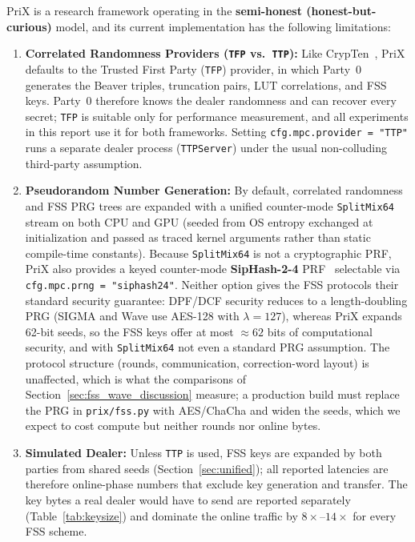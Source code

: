 \documentclass[11pt]{article}
\begin{document}
PriX is a research framework operating in the \textbf{semi-honest (honest-but-curious)} model, and its current implementation has the following limitations:
\begin{enumerate}
    \item \textbf{Correlated Randomness Providers (\texttt{TFP} vs.\ \texttt{TTP}):} Like CrypTen~\cite{knott2021crypten}, PriX defaults to the Trusted First Party (\texttt{TFP}) provider, in which Party~0 generates the Beaver triples, truncation pairs, LUT correlations, and FSS keys. Party~0 therefore knows the dealer randomness and can recover every secret; \texttt{TFP} is suitable only for performance measurement, and all experiments in this report use it for both frameworks. Setting \texttt{cfg.mpc.provider = "TTP"} runs a separate dealer process (\texttt{TTPServer}) under the usual non-colluding third-party assumption.
    \item \textbf{Pseudorandom Number Generation:} By default, correlated randomness and FSS PRG trees are expanded with a unified counter-mode \texttt{SplitMix64} stream on both CPU and GPU (seeded from OS entropy exchanged at initialization and passed as traced kernel arguments rather than static compile-time constants). Because \texttt{SplitMix64} is not a cryptographic PRF, PriX also provides a keyed counter-mode \textbf{SipHash-2-4} PRF~\cite{aumasson2012siphash} selectable via \texttt{cfg.mpc.prng = "siphash24"}. Neither option gives the FSS protocols their standard security guarantee: DPF/DCF security reduces to a length-doubling PRG (SIGMA and Wave use AES-128 with $\lambda = 127$), whereas PriX expands 62-bit seeds, so the FSS keys offer at most $\approx 62$ bits of computational security, and with \texttt{SplitMix64} not even a standard PRG assumption. The protocol structure (rounds, communication, correction-word layout) is unaffected, which is what the comparisons of Section~\ref{sec:fss_wave_discussion} measure; a production build must replace the PRG in \texttt{prix/fss.py} with AES/ChaCha and widen the seeds, which we expect to cost compute but neither rounds nor online bytes.
    \item \textbf{Simulated Dealer:} Unless \texttt{TTP} is used, FSS keys are expanded by both parties from shared seeds (Section~\ref{sec:unified}); all reported latencies are therefore online-phase numbers that exclude key generation and transfer. The key bytes a real dealer would have to send are reported separately (Table~\ref{tab:keysize}) and dominate the online traffic by $8\times$--$14\times$ for every FSS scheme.

\end{enumerate}
\end{document}
